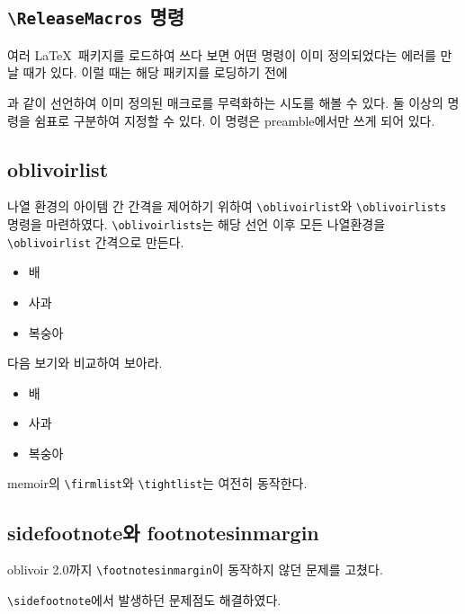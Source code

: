 \documentclass[
	12pt,
	a4paper,
	kosection,
	footnote,
	nobookmarks,
	microtype,
	figtabcapt,
]{oblivoir}
\def\cs#1{\texttt{\textbackslash #1}}
\begin{document}
\subsection{\cs{ReleaseMacros} 명령}

여러 \LaTeX\ 패키지를 로드하여 쓰다 보면 어떤 명령이 이미 정의되었다는 에러를
만날 때가 있다. 이럴 때는 해당 패키지를 로딩하기 전에
\begin{boxedverbatim}
\ReleaseMacros{\XeTeX,\XeLaTeX}
\end{boxedverbatim}
과 같이 선언하여 이미 정의된 매크로를 무력화하는 시도를 해볼 수 있다.
둘 이상의 명령을 쉼표로 구분하여 지정할 수 있다.
이 명령은 preamble에서만 쓰게 되어 있다.


\subsection{oblivoirlist}

나열 환경의 아이템 간 간격을 제어하기 위하여 \verb|\oblivoirlist|와 
\verb|\oblivoirlists| 명령을 마련하였다. \verb|\oblivoirlists|는
해당 선언 이후 모든 나열환경을 \verb|\oblivoirlist| 간격으로 만든다.

\begin{itemize}\oblivoirlist
\item 배
\item 사과
\item 복숭아
\end{itemize}

다음 보기와 비교하여 보아라.

\begin{itemize}
\item 배
\item 사과
\item 복숭아
\end{itemize}

\footnotesinmargin
\textsf{memoir}의 \verb|\firmlist|와 \verb|\tightlist|는 여전히 동작한다.
\addtocounter{footnote}{-1}

\subsection{sidefootnote와 footnotesinmargin}

oblivoir 2.0까지 \verb|\footnotesinmargin|이 동작하지 않던 문제를 고쳤다.\footnotemark

\verb|\sidefootnote|에서 발생하던 문제점도 해결하였다.
\end{document}

